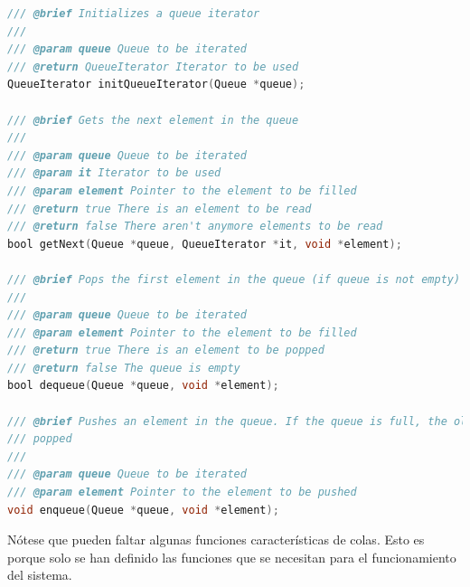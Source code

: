 \documentclass[a4paper,12pt]{article}
\begin{document}
\begin{itemize}
\begin{lstlisting}[language=C]
/// @brief Initializes a queue iterator
///
/// @param queue Queue to be iterated
/// @return QueueIterator Iterator to be used
QueueIterator initQueueIterator(Queue *queue);

/// @brief Gets the next element in the queue
///
/// @param queue Queue to be iterated
/// @param it Iterator to be used
/// @param element Pointer to the element to be filled
/// @return true There is an element to be read
/// @return false There aren't anymore elements to be read
bool getNext(Queue *queue, QueueIterator *it, void *element);

/// @brief Pops the first element in the queue (if queue is not empty)
///
/// @param queue Queue to be iterated
/// @param element Pointer to the element to be filled
/// @return true There is an element to be popped
/// @return false The queue is empty
bool dequeue(Queue *queue, void *element);

/// @brief Pushes an element in the queue. If the queue is full, the oldest element will be
/// popped
///
/// @param queue Queue to be iterated
/// @param element Pointer to the element to be pushed
void enqueue(Queue *queue, void *element);
        \end{lstlisting}
        Nótese que pueden faltar algunas funciones características de colas. Esto es porque solo se han
        definido las funciones que se necesitan para el funcionamiento del sistema.
\end{itemize}
\end{document}
